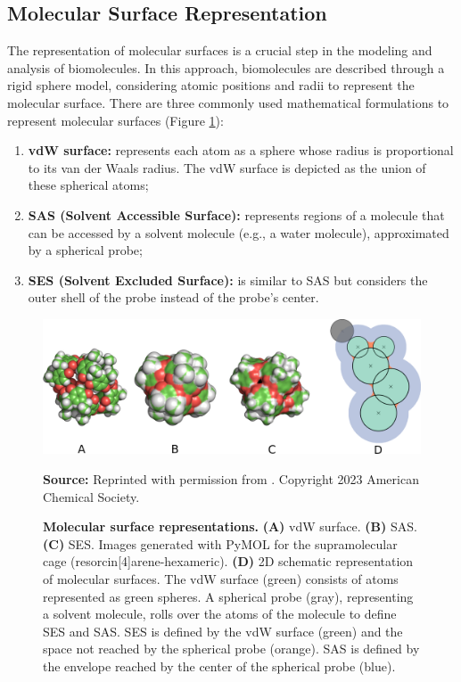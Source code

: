 \documentclass[Ingles]{phdthesis}
\begin{document}
\subsection{Molecular Surface Representation}

The representation of molecular surfaces is a crucial step in the modeling and analysis of biomolecules. In this approach, biomolecules are described through a rigid sphere model, considering atomic positions and radii to represent the molecular surface. There are three commonly used mathematical formulations to represent molecular surfaces (Figure \ref{fig:surface-representation}):

\begin{enumerate}[label=\textbf{(\Alph*)}]
  \item \textbf{vdW surface:} represents each atom as a sphere whose radius is proportional to its van der Waals radius. The vdW surface is depicted as the union of these spherical atoms;
  \item \textbf{SAS (Solvent Accessible Surface):} represents regions of a molecule that can be accessed by a solvent molecule (e.g., a water molecule), approximated by a spherical probe;
  \item \textbf{SES (Solvent Excluded Surface):} is similar to SAS but considers the outer shell of the probe instead of the probe's center.
\end{enumerate}
  
\begin{figure}[ht]
  \centerline{\includegraphics[scale=1]{images/surface-representation.png}}
  \centerline{\tiny{\textbf{Source:} Reprinted with permission from \cite{guerra2023B}. Copyright 2023 American Chemical Society.}}
  \caption[Molecular surface representations]{\textbf{Molecular surface representations.} \textbf{(A)} vdW surface. \textbf{(B)} SAS. \textbf{(C)} SES. Images generated with PyMOL for the supramolecular cage (resorcin[4]arene-hexameric). \textbf{(D)} 2D schematic representation of molecular surfaces. The vdW surface (green) consists of atoms represented as green spheres. A spherical probe (gray), representing a solvent molecule, rolls over the atoms of the molecule to define SES and SAS. SES is defined by the vdW surface (green) and the space not reached by the spherical probe (orange). SAS is defined by the envelope reached by the center of the spherical probe (blue).}
  \label{fig:surface-representation}
\end{figure}
\end{document}
